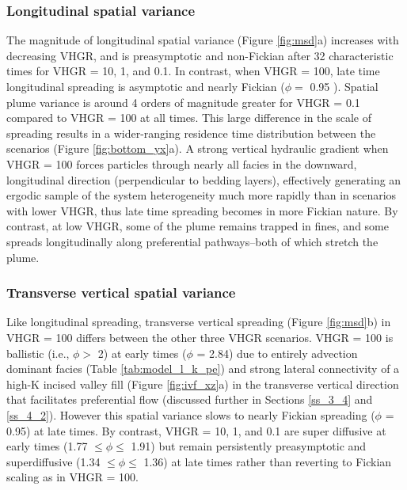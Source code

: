 \subsubsection{Longitudinal spatial variance}
\label{ss_3_2a}
The magnitude of longitudinal spatial variance (Figure \ref{fig:msd}a) increases with decreasing VHGR, and is preasymptotic and non-Fickian after 32 characteristic times for VHGR = 10, 1, and 0.1. In contrast, when VHGR = 100, late time longitudinal spreading is asymptotic and nearly Fickian ($\phi = $ 0.95 ). Spatial plume variance is around 4 orders of magnitude greater for VHGR = 0.1 compared to VHGR = 100 at all times. This large difference in the scale of spreading results in a wider-ranging residence time distribution between the scenarios (Figure \ref{fig:bottom_yx}a). A strong vertical hydraulic gradient when VHGR = 100 forces particles through nearly all facies in the downward, longitudinal direction (perpendicular to bedding layers), effectively generating an ergodic sample of the system heterogeneity much more rapidly than in scenarios with lower VHGR, thus late time spreading becomes in more Fickian nature. By contrast, at low VHGR, some of the plume remains trapped in fines, and some spreads longitudinally along preferential pathways--both of which stretch the plume.


\subsubsection{Transverse vertical spatial variance}
\label{ss_3_2b}
Like longitudinal spreading, transverse vertical spreading (Figure \ref{fig:msd}b) in VHGR = 100 differs between the other three VHGR scenarios. VHGR = 100 is ballistic (i.e., $\phi >$ 2) at early times ($\phi$ = 2.84) due to entirely advection dominant facies (Table \ref{tab:model_l_k_pe}) and strong lateral connectivity of a high-K incised valley fill (Figure \ref{fig:ivf_xz}a) in the transverse vertical direction that facilitates preferential flow (discussed further in Sections \ref{ss_3_4} and \ref{ss_4_2}). However this spatial variance slows to nearly Fickian spreading ($\phi$ = 0.95) at late times. By contrast, VHGR = 10, 1, and 0.1 are super diffusive at early times (1.77 $\leq \phi \leq$ 1.91) but remain persistently preasymptotic and superdiffusive (1.34 $\leq \phi \leq$ 1.36) at late times rather than reverting to Fickian scaling as in VHGR = 100. 

